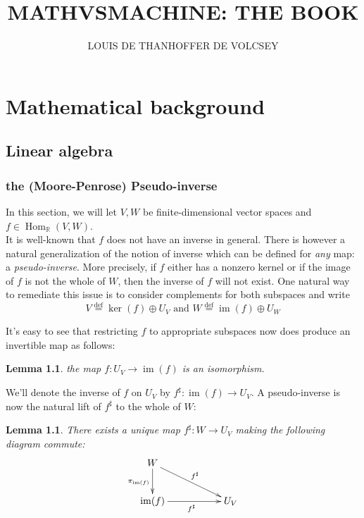 \documentclass{book}
\theoremstyle{plain}
\newtheorem{lemma}[corollary]{Lemma}
\theoremstyle{definition}
\renewcommand{\d}[1]{\mathbb{#1}}
\newcommand{\define}{\stackrel{\operatorname{def}}{=}}
\newcommand{\ds}{\oplus}
\DeclareMathOperator{\Hom}{Hom}
\DeclareMathOperator{\im}{im}
\newcommand{\mor}{\longrightarrow}
\begin{document}
\title{\textbf{MATHVSMACHINE: THE BOOK}}
\author{LOUIS DE THANHOFFER DE VOLCSEY}
\date{}
\maketitle	


\noindent\hrulefill
\tableofcontents{}
\noindent\hrulefill

\part{Mathematical background}

\chapter{Linear algebra}

\section{the (Moore-Penrose) Pseudo-inverse}

In this section, we will let $V, W$ be finite-dimensional vector spaces and $f \in \Hom_\d{R}(V,W)$.\\ It is well-known that $f$ does not have an inverse in general. There is however a natural generalization of the notion of inverse which can be defined for \emph{any} map: a \emph{pseudo-inverse}. More precisely, if $f$ either has  a nonzero kernel or if the image of $f$ is not the whole of $W$, then the inverse of $f$ will not exist. One natural way to remediate this issue is to consider complements for both subspaces and write 
\[V\define \ker(f)\ds U_V \textrm{ and } W\define \im(f)\ds U_W\]

It's easy to see that restricting $f$ to appropriate subspaces now does produce an invertible map as follows:

\begin{lemma}
	the map $f: U_V\mor \im(f)$ is an isomorphism.
\end{lemma}
\noindent We'll denote the inverse of $f$ on $U_V$ by $f^\sharp:\im(f)\mor U_V$. A pseudo-inverse is now the natural lift of $f^\sharp$ to the whole of $W$:


\begin{lemma}\label{lem:pseudo-inverse}
	There exists a unique map $f^\sharp:W\mor U_V$ making the following diagram commute:
	\begin{displaymath}
	\xymatrix{
	W\ar[d]_{\pi_{\im(f)}}\ar[drr]^{f^\sharp}\\
	\im(f)\ar[rr]_{f^\sharp} && U_V
	}
	\end{displaymath}
\end{lemma}
\end{document}
